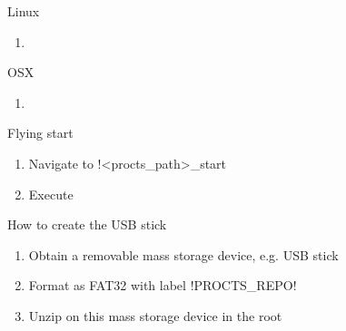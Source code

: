 \begin{frame}[fragile]{Linux}
\begin{enumerate}
\item \tbc
\end{enumerate}
\end{frame}

\begin{frame}[fragile]{OSX}
\begin{enumerate}
\item \tbc
\end{enumerate}
\end{frame}

\begin{frame}[fragile]{Flying start}
\begin{enumerate}
\item Navigate to !<procts_path>\flying_start\!
\item Execute \TOEXECUTE
\end{enumerate}
\end{frame}

\begin{frame}[fragile]{How to create the USB stick}
\begin{enumerate}
\item Obtain a removable mass storage device, e.g. USB stick
\item Format as FAT32 with label !PROCTS_REPO!
\item Unzip {\tbc} on this mass storage device in the root
\end{enumerate}
\end{frame}
